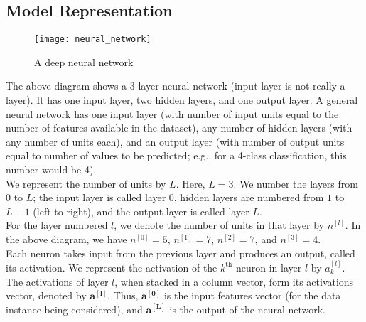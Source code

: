 \documentclass[a4paper, 12pt]{article}
\begin{document}
\subsection{Model Representation}
\begin{figure}[H]
\centering
\texttt{[image: neural\_network]}
\caption{A deep neural network}
\end{figure}
The above diagram shows a 3-layer neural network (input layer is not really a layer). It has one input layer, two hidden layers, and one output layer. A general neural network has one input layer (with number of input units equal to the number of features available in the dataset), any number of hidden layers (with any number of units each), and an output layer (with number of output units equal to number of values to be predicted; e.g., for a 4-class classification, this number would be 4). \\
\break
We represent the number of units by $L$. Here, $L = 3$. We number the layers from $0$ to $L$; the input layer is called layer $0$, hidden layers are numbered from $1$ to $L-1$ (left to right), and the output layer is called layer $L$. \\
\break
For the layer numbered $l$, we denote the number of units in that layer by $n^{\left[l\right]}$. In the above diagram, we have $n^{\left[0\right]} = 5$, $n^{\left[1\right]} = 7$, $n^{\left[2\right]} = 7$, and $n^{\left[3\right]} = 4$. \\
\break
Each neuron takes input from the previous layer and produces an output, called its activation. We represent the activation of the $k^{\text{th}}$ neuron in layer $l$ by $a_{k}^{\left[l\right]}$. The activations of layer $l$, when stacked in a column vector, form its activations vector, denoted by $\bm{a^{\left[l\right]}}$. Thus, $\bm{a^{\left[0\right]}}$ is the input features vector (for the data instance being considered), and $\bm{a^{\left[L\right]}}$ is the output of the neural network.
\end{document}
